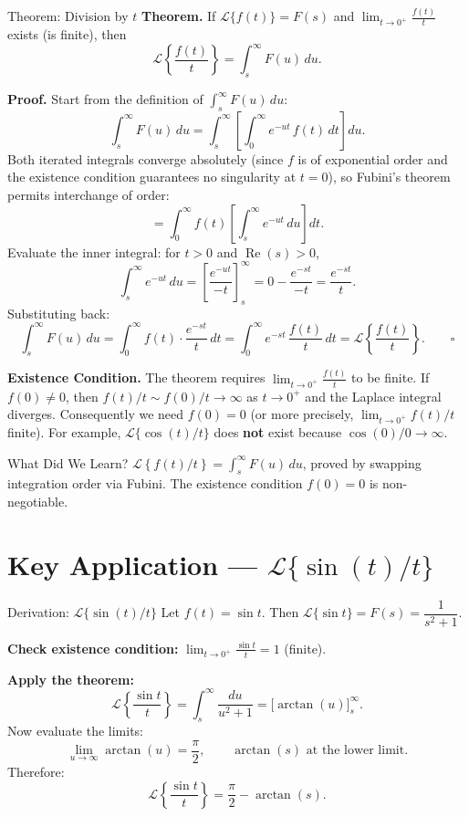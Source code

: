 \documentclass[12pt,a4paper]{article}
\begin{document}
\begin{infobox}{Theorem: Division by $t$}
\textbf{Theorem.}\;
If $\mathcal{L}\{f(t)\} = F(s)$ and $\displaystyle\lim_{t \to 0^+}
\frac{f(t)}{t}$ exists (is finite), then
\[
  \mathcal{L}\!\left\{\frac{f(t)}{t}\right\} = \int_s^\infty F(u)\,du.
\]

\textbf{Proof.}\;
Start from the definition of $\int_s^\infty F(u)\,du$:
\[
  \int_s^\infty F(u)\,du
  = \int_s^\infty \left[\int_0^\infty e^{-ut}\,f(t)\,dt\right] du.
\]
Both iterated integrals converge absolutely (since $f$ is of exponential order
and the existence condition guarantees no singularity at $t=0$), so Fubini's
theorem permits interchange of order:
\[
  = \int_0^\infty f(t)\left[\int_s^\infty e^{-ut}\,du\right] dt.
\]
Evaluate the inner integral: for $t > 0$ and $\operatorname{Re}(s) > 0$,
\[
  \int_s^\infty e^{-ut}\,du
  = \left[\frac{e^{-ut}}{-t}\right]_s^\infty
  = 0 - \frac{e^{-st}}{-t}
  = \frac{e^{-st}}{t}.
\]
Substituting back:
\[
  \int_s^\infty F(u)\,du
  = \int_0^\infty f(t)\cdot\frac{e^{-st}}{t}\,dt
  = \int_0^\infty e^{-st}\,\frac{f(t)}{t}\,dt
  = \mathcal{L}\!\left\{\frac{f(t)}{t}\right\}. \qquad\square
\]

\textbf{Existence Condition.}\;
The theorem requires $\displaystyle\lim_{t \to 0^+}\frac{f(t)}{t}$ to be
finite. If $f(0)\neq 0$, then $f(t)/t \sim f(0)/t \to \infty$ as $t\to 0^+$
and the Laplace integral diverges. Consequently we need $f(0)=0$ (or more
precisely, $\lim_{t\to 0^+}f(t)/t$ finite). For example,
$\mathcal{L}\{\cos(t)/t\}$ does \textbf{not} exist because
$\cos(0)/0 \to \infty$.
\end{infobox}

\begin{learnbox}{What Did We Learn?}
$\mathcal{L}\!\left\{f(t)/t\right\} = \int_s^\infty F(u)\,du$, proved by
swapping integration order via Fubini. The existence condition $f(0)=0$ is
non-negotiable.
\end{learnbox}

\section{Key Application --- \texorpdfstring{$\mathcal{L}\{\sin(t)/t\}$}{L{sin(t)/t}}}

\begin{infobox}{Derivation: $\mathcal{L}\{\sin(t)/t\}$}
Let $f(t) = \sin t$. Then $\mathcal{L}\{\sin t\} = F(s) = \dfrac{1}{s^2+1}$.

\textbf{Check existence condition:}
$\displaystyle\lim_{t\to 0^+}\frac{\sin t}{t} = 1$ (finite). \checkmark

\textbf{Apply the theorem:}
\[
  \mathcal{L}\!\left\{\frac{\sin t}{t}\right\}
  = \int_s^\infty \frac{du}{u^2+1}
  = \Big[\arctan(u)\Big]_s^\infty.
\]
Now evaluate the limits:
\[
  \lim_{u\to\infty}\arctan(u) = \frac{\pi}{2}, \qquad
  \arctan(s)\text{ at the lower limit}.
\]
Therefore:
\[
  \mathcal{L}\!\left\{\frac{\sin t}{t}\right\}
  = \frac{\pi}{2} - \arctan(s).
\]
\end{infobox}
\end{document}
